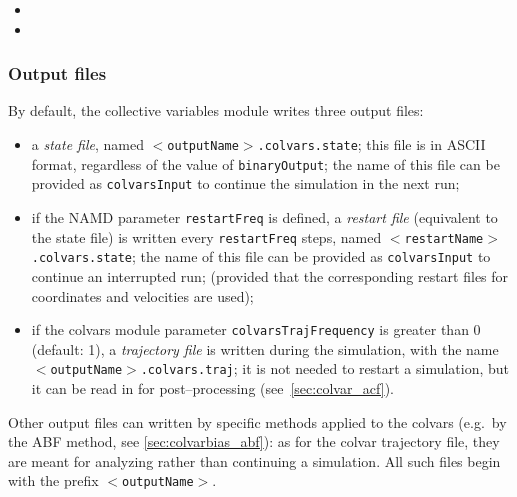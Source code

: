 \begin{itemize}
\item %

\item %

\end{itemize}


\subsubsection*{Output files}

By default, the collective variables module writes three output
files:
\begin{itemize}
\item a \emph{state file}, named
  \texttt{$<$outputName$>$.colvars.state}; this file is in
  ASCII format, regardless of the value of \texttt{binaryOutput};
  the name of this file can be provided as \texttt{colvarsInput}
  to continue the simulation in the next run;
\item if the NAMD parameter \texttt{restartFreq} is defined, a
  \emph{restart file} (equivalent to the state file) is written every
  \texttt{restartFreq} steps, named
  \texttt{$<$restartName$>$.colvars.state}; the name of this file
  can be provided as \texttt{colvarsInput} to continue an interrupted run;
  (provided that the corresponding restart files for coordinates
  and velocities are used);
\item if the colvars module parameter
  \texttt{colvarsTrajFrequency} is greater than 0 (default: 1), a
  \emph{trajectory file} is written during the simulation, with the
  name \texttt{$<$outputName$>$.colvars.traj}; it is not
  needed to restart a simulation, but it can be read in for post--processing
  (see~\ref{sec:colvar_acf}).
\end{itemize}
Other output files can written by specific methods applied to the
colvars (e.g.~by the ABF method, see \ref{sec:colvarbias_abf}): as for
the colvar trajectory file, they are meant for analyzing rather than
continuing a simulation. All such files begin with the prefix
\texttt{$<$outputName$>$}.


